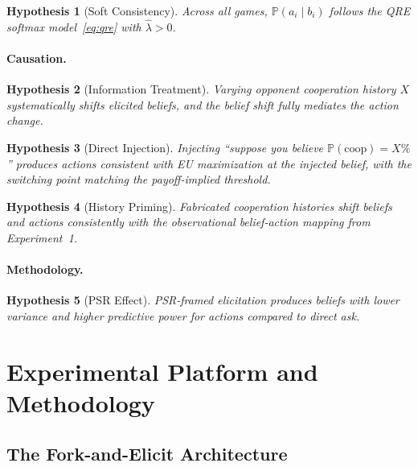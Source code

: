\documentclass[12pt]{article}
\newtheorem{hypothesis}{Hypothesis}
\newcommand{\Prob}{\mathbb{P}}
\begin{document}
\begin{hypothesis}[Soft Consistency]
\label{hyp:soft}
Across all games, $\Prob(a_i \mid b_i)$ follows the QRE softmax model~\eqref{eq:qre} with $\hat\lambda > 0$.
\end{hypothesis}

\paragraph{Causation.}
\begin{hypothesis}[Information Treatment]
\label{hyp:info}
Varying opponent cooperation history $X$ systematically shifts elicited beliefs, and the belief shift fully mediates the action change.
\end{hypothesis}

\begin{hypothesis}[Direct Injection]
\label{hyp:injection}
Injecting ``suppose you believe $\Prob(\text{coop}) = X\%$'' produces actions consistent with EU maximization at the injected belief, with the switching point matching the payoff-implied threshold.
\end{hypothesis}

\begin{hypothesis}[History Priming]
\label{hyp:priming}
Fabricated cooperation histories shift beliefs and actions consistently with the observational belief-action mapping from Experiment~1.
\end{hypothesis}

\paragraph{Methodology.}
\begin{hypothesis}[PSR Effect]
\label{hyp:psr}
PSR-framed elicitation produces beliefs with lower variance and higher predictive power for actions compared to direct ask.
\end{hypothesis}


\section{Experimental Platform and Methodology}
\label{sec:platform}

\subsection{The Fork-and-Elicit Architecture}
\label{sec:fork}
\end{document}
